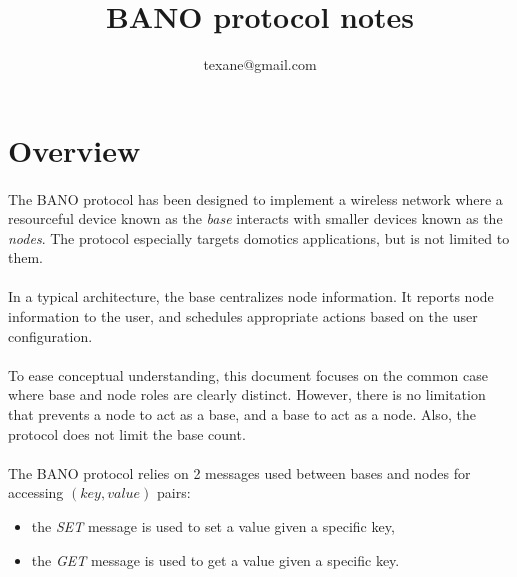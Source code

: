 \documentclass[a4paper, 11pt]{article}
\begin{document}
\title{BANO protocol notes}
\author{texane@gmail.com}
\date{}

\maketitle



\clearpage
\section{Overview}

\paragraph{}
The BANO protocol has been designed to implement a wireless network where a
resourceful device known as the \textit{base} interacts with smaller devices
known as the \textit{nodes}. The protocol especially targets domotics applications,
but is not limited to them.

\paragraph{}
In a typical architecture, the base centralizes node information. It reports
node information to the user, and schedules appropriate actions based on the
user configuration.

\paragraph{}
To ease conceptual understanding, this document focuses on the common case where
base and node roles are clearly distinct. However, there is no limitation that
prevents a node to act as a base, and a base to act as a node. Also, the protocol
does not limit the base count.

\paragraph{}
The BANO protocol relies on 2 messages used between bases and nodes for accessing
$(key,value)$ pairs:
\begin{itemize}
\item the \textit{SET} message is used to set a value given a specific key,
\item the \textit{GET} message is used to get a value given a specific key.
\end{itemize}
\end{document}
